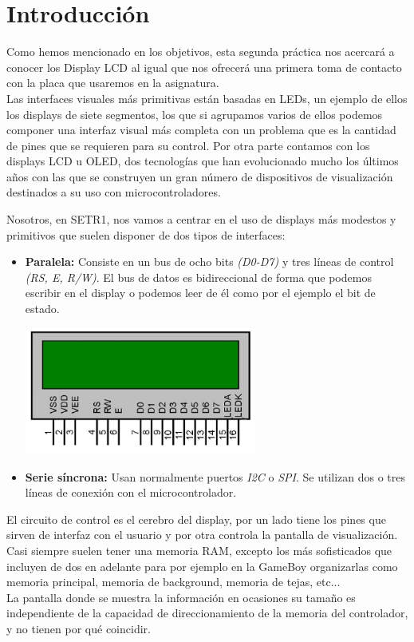 \documentclass[11pt,a4paper]{article}
\begin{document}
	\section{Introducción}
	\large{
		Como hemos mencionado en los objetivos, esta segunda práctica nos acercará a conocer los Display LCD al igual que nos ofrecerá una primera toma de contacto con la placa que usaremos en la asignatura.\\
		
		Las interfaces visuales más primitivas están basadas en LEDs, un ejemplo de ellos los displays de siete segmentos, los que si agrupamos varios de ellos podemos componer una interfaz visual más completa con un problema que es la cantidad de pines que se requieren para su control. Por otra parte contamos con los displays LCD u OLED, dos tecnologías que han evolucionado mucho los últimos años con las que se construyen un gran número de dispositivos de visualización destinados a su uso con microcontroladores.
		
		Nosotros, en SETR1, nos vamos a centrar en el uso de displays más modestos y primitivos que suelen disponer de dos tipos de interfaces:
		\begin{itemize}
			\item \textbf{Paralela:} Consiste en un bus de ocho bits \textit{(D0-D7)} y tres líneas de control \textit{(RS, E, R/W)}. El bus de datos es bidireccional de forma que podemos escribir en el display o podemos leer de él como por el ejemplo el bit de estado.
			
			\begin{center}
				\includegraphics[width=0.6\textwidth]{pinout-display.png}
			\end{center}
			
			\item \textbf{Serie síncrona:} Usan normalmente puertos \textit{I2C} o \textit{SPI}. Se utilizan dos o tres líneas de conexión con el microcontrolador.
		\end{itemize}
		
		El circuito de control es el cerebro del display, por un lado tiene los pines que sirven de interfaz con el usuario y por otra controla la pantalla de visualización. Casi siempre suelen tener una memoria RAM, excepto los más sofisticados que incluyen de dos en adelante para por ejemplo en la GameBoy organizarlas como memoria principal, memoria de background, memoria de tejas, etc...\\
		
		La pantalla donde se muestra la información en ocasiones su tamaño es independiente de la capacidad de direccionamiento de la memoria del controlador, y no tienen por qué coincidir. 
	}
	
\end{document}
